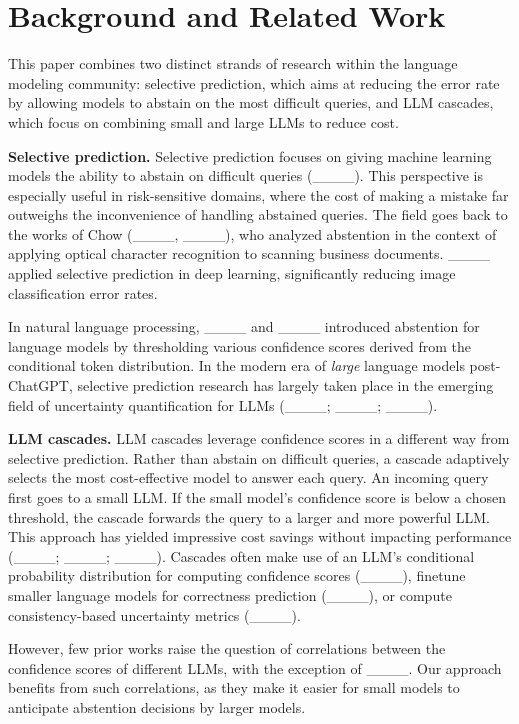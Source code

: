 \section{Background and Related Work}
This paper combines two distinct strands of research within the language modeling community: selective prediction, which aims at reducing the error rate by allowing models to abstain on the most difficult queries, and LLM cascades, which focus on combining small and large LLMs to reduce cost.

\noindent \textbf{Selective prediction.} Selective prediction focuses on giving machine learning models the ability to abstain on difficult queries (____). This perspective is especially useful in risk-sensitive domains, where the cost of making a mistake far outweighs the inconvenience of handling abstained queries. The field goes back to the works of Chow (____, ____), who analyzed abstention in the context of applying optical character recognition to scanning business documents. ____ applied selective prediction in deep learning, significantly reducing image classification error rates.

In natural language processing, ____ and ____ introduced abstention for language models by thresholding various confidence scores derived from the conditional token distribution. In the modern era of \textit{large} language models post-ChatGPT, selective prediction research has largely taken place in the emerging field of uncertainty quantification for LLMs (____; ____; ____). 


\noindent \textbf{LLM cascades.} LLM cascades leverage confidence scores in a different way from selective prediction. Rather than abstain on difficult queries, a cascade adaptively selects the most cost-effective model to answer each query. An incoming query first goes to a small LLM. If the small model's confidence score is below a chosen threshold, the cascade forwards the query to a larger and more powerful LLM. This approach has yielded impressive cost savings without impacting performance (____; ____; ____). Cascades often make use of an LLM's conditional probability distribution for computing confidence scores (____), finetune smaller language models for correctness prediction (____), or compute consistency-based uncertainty metrics (____).

However, few prior works raise the question of correlations between the confidence scores of different LLMs, with the exception of ____. Our approach benefits from such correlations, as they make it easier for small models to anticipate abstention decisions by larger models.